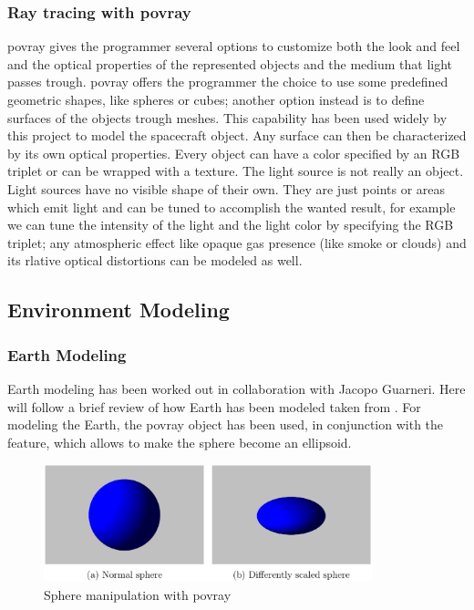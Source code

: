 \subsubsection{Ray tracing with \acrshort{povray}}
\acrshort{povray} gives the programmer several options to customize both the look and feel and the optical properties of the represented objects and the medium that light passes trough.
\acrshort{povray} offers the programmer the choice to use some predefined geometric shapes, like spheres or cubes; another option instead is to define surfaces of the objects trough meshes. This capability has been used widely by this project to model the spacecraft object.
Any surface can then be characterized by its own optical properties. Every object can have a color specified by an RGB triplet or can be wrapped with a texture.
The light source is not really an object. Light sources have no visible shape of their own. They are just points or areas which emit light and can be tuned to accomplish the wanted result, for example we can tune the intensity of the light and the light color by specifying the RGB triplet; any atmospheric effect like opaque gas presence (like smoke or clouds) and its rlative optical distortions can be modeled as well.

\subsection{Environment Modeling}
\subsubsection{Earth Modeling}
Earth modeling has been worked out in collaboration with Jacopo Guarneri.
Here will follow a brief review of how Earth has been modeled taken from \cite{jacopo}.
For modeling the Earth, the \acrshort{povray}  object has been used, in conjunction with the  feature, which allows to make the sphere become an ellipsoid.

\begin{figure}[htbp]
  \centering
  \includegraphics[width=0.85\textwidth]{gfx/sphere_scaling.eps}
  \caption{Sphere manipulation with \acrshort{povray} \cite{jacopo}}
  \label{fig:spherescaling}
\end{figure}

